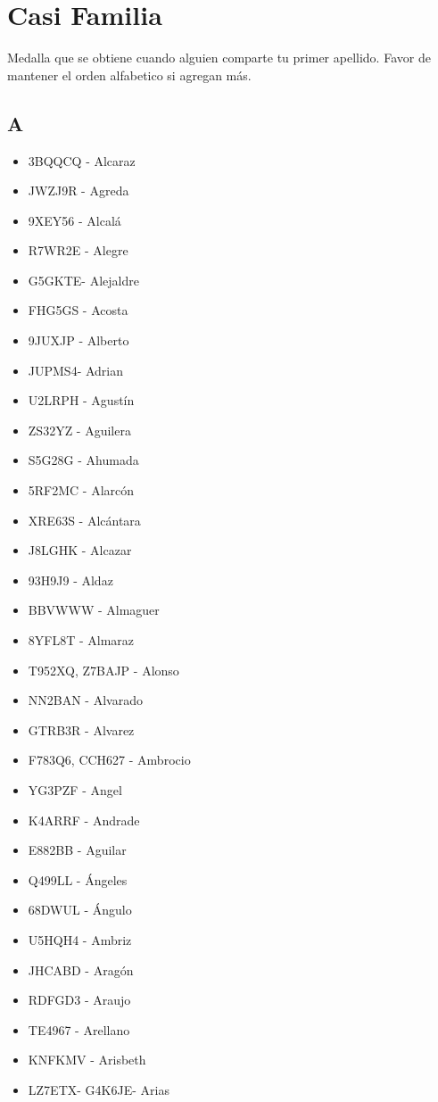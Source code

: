 \section{Casi Familia}
Medalla que se obtiene cuando alguien comparte tu primer apellido. Favor de mantener el orden alfabetico si agregan más.

\subsection*{A}
\begin{itemize}[leftmargin=*,nosep]
\item 3BQQCQ - Alcaraz
\item JWZJ9R - Agreda
\item 9XEY56 - Alcalá
\item R7WR2E - Alegre
\item G5GKTE- Alejaldre
\item FHG5GS - Acosta
\item 9JUXJP - Alberto
\item JUPMS4- Adrian
\item U2LRPH - Agustín
\item ZS32YZ - Aguilera
\item S5G28G  -  Ahumada
\item 5RF2MC  -  Alarcón
\item XRE63S - Alcántara
\item J8LGHK - Alcazar
\item 93H9J9 -  Aldaz
\item BBVWWW  -  Almaguer
\item 8YFL8T - Almaraz
\item T952XQ, Z7BAJP -  Alonso
\item NN2BAN  -  Alvarado
\item GTRB3R  -  Alvarez
\item F783Q6, CCH627 - Ambrocio
\item YG3PZF - Angel
\item K4ARRF - Andrade
\item E882BB - Aguilar
\item Q499LL  -  Ángeles
\item 68DWUL  - Ángulo
\item U5HQH4 - Ambriz
\item JHCABD  -  Aragón
\item RDFGD3 - Araujo
\item TE4967 - Arellano
\item KNFKMV  -  Arisbeth
\item LZ7ETX- G4K6JE- Arias

\end{itemize}
